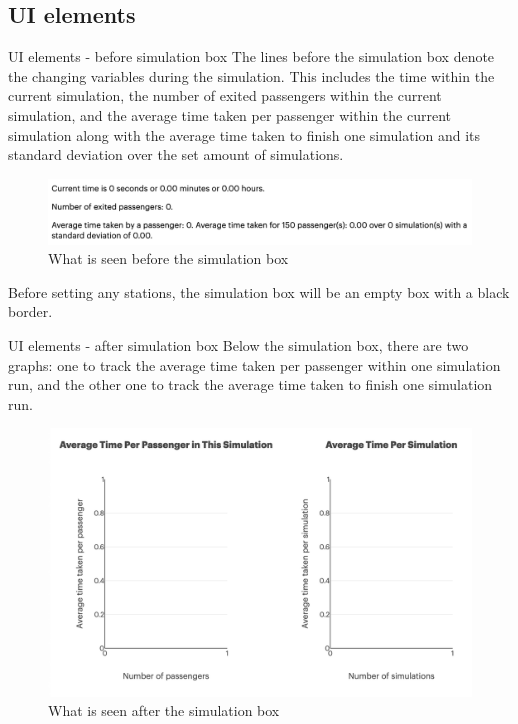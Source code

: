 \documentclass{beamer}
\begin{document}
\subsection{UI elements}
\begin{frame}{UI elements - before simulation box}
	The lines before the simulation box denote the changing variables during the simulation. This includes the time within the current simulation, the number of exited passengers within the current simulation, and the average time taken per passenger within the current simulation along with the average time taken to finish one simulation and its standard deviation over the set amount of simulations.
	\begin{figure}
		\includegraphics[width=\linewidth]{../img/befSimBox}
		\caption{What is seen before the simulation box}
	\end{figure}

	Before setting any stations, the simulation box will be an empty box with a black border.
	
\end{frame}

\begin{frame}{UI elements - after simulation box}
	Below the simulation box, there are two graphs: one to track the average time taken per passenger within one simulation run, and the other one to track the average time taken to finish one simulation run.
	\begin{figure}
		\includegraphics[scale=0.3]{../img/graphs}
		\caption{What is seen after the simulation box}
	\end{figure}
	
\end{frame}
\end{document}
